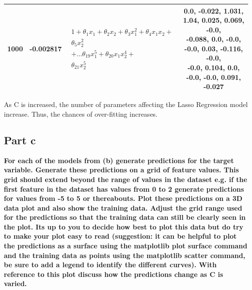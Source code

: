 \documentclass[10pt]{article}
\begin{document}
\begin{table}[H]
\begin{center}
\begin{tabular}{ |c|c|c|c| }
      \hline
      1000 & -0.002817 & $\begin{aligned}1 + \theta_{1}x_{1} + \theta_{2}x_{2} + \theta_{3}x_{1}^{2}+ \theta_{4}x_{1}x_{2}+\\\nonumber \theta_{5}x_{2}^{2}\\\nonumber+\dots \theta_{19}x_{1}^{5}+ \theta_{20}x_{1}x_{2}^{4}+ \\\nonumber \theta_{21}x_{2}^{5}\end{aligned}$ & \makecell{0.0, -0.022, 1.031, 1.04, 0.025, 0.069, -0.0, \\-0.088, 0.0, -0.0, -0.0, 0.03, -0.116, -0.0, \\-0.0, 0.104, 0.0, -0.0, -0.0, 0.091, -0.027} \\
      \hline
    \end{tabular}
  \end{center}
\end{table}

As C is increased, the number of parameters affecting the Lasso Regression model increase. Thus, the chances of over-fitting increases.

\subsection*{Part c}
\textbf{For each of the models from (b) generate predictions for the target variable.
  Generate these predictions on a grid of feature values. This grid should extend beyond the range of values in the dataset e.g. if the
  first feature in the dataset has values from 0 to 2 generate predictions for values
  from -5 to 5 or thereabouts. Plot these predictions on a 3D data plot and also
  show the training data. Adjust the grid range used for the predictions so that the
  training data can still be clearly seen in the plot. Its up to you to decide how best
  to plot this data but do try to make your plot easy to read (suggestion: it can
  be helpful to plot the predictions as a surface using the matplotlib plot surface
  command and the training data as points using the matplotlib scatter command,
  be sure to add a legend to identify the different curves). With reference to this
  plot discuss how the predictions change as C is varied.}
\end{document}
